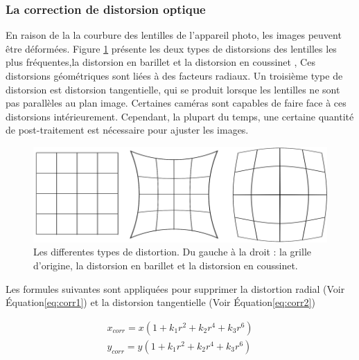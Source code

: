 \documentclass[
]{article}
\begin{document}
\hypertarget{la-correction-de-distorsion-optique}{%
\subsubsection*{La correction de distorsion optique}\label{la-correction-de-distorsion-optique}}

En raison de la la courbure des lentilles de l'appareil photo, les images peuvent être déformées. Figure \ref{fig:lens} présente les deux types de distorsions des lentilles les plus fréquentes,la distorsion en barillet et la distorsion en coussinet \citep{fryer_lens_1986} , Ces distorsions géométriques sont liées à des facteurs radiaux. Un troisième type de distorsion est distorsion tangentielle, qui se produit lorsque les lentilles ne sont pas parallèles au plan
image. Certaines caméras sont capables de faire face à ces distorsions
intérieurement. Cependant, la plupart du temps, une certaine quantité de post-traitement est
nécessaire pour ajuster les images.



\begin{figure}
\includegraphics[width=1\linewidth]{images/lens} \caption{Les differentes types de distortion. Du gauche à la droit : la grille d'origine, la distorsion en barillet et la distorsion en coussinet.}\label{fig:lens}
\end{figure}

Les formules suivantes sont appliquées pour supprimer la distortion radial (Voir Équation\eqref{eq:corr1}) et la distorsion tangentielle (Voir Équation\eqref{eq:corr2})

\begin{equation}
\begin{aligned}
  x_{corr} = x\left(1+k_1r^2+k_2r^4+k_3r^6\right)
  \\y_{corr} = y\left(1+k_1r^2+k_2r^4+k_3r^6\right)
\end{aligned}
 \label{eq:corr1}
\end{equation}
\end{document}
